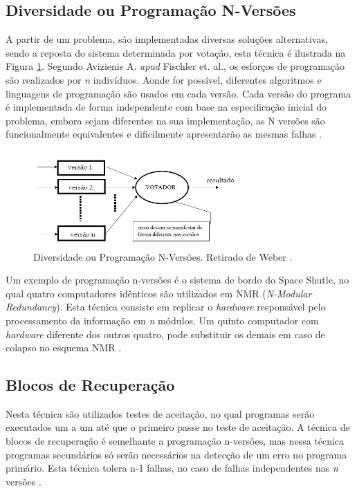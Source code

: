 \subsection{Diversidade ou Programação N-Versões}

A partir de um problema, são implementadas diversas soluções alternativas, sendo a reposta do sistema determinada por votação, esta técnica é ilustrada na Figura \ref{Img:nVersion}. Segundo Avizienis \cite{Avizienis:1995} A. \textit{apud} Fischler et. al., os esforços de programação são realizados por \textit{n} indivíduos. Aonde for possível, diferentes algoritmos e linguagens de programação são usados em cada versão. Cada versão do programa é implementada de forma independente com base na especificação inicial do problema, embora sejam diferentes na sua implementação, as N versões são funcionalmente equivalentes e dificilmente apresentarão as mesmas falhas \cite{Avizienis:1995}. 

\begin{figure}[H]
	\centering
	\includegraphics[width=0.7\textwidth]{figuras/nVersions.jpg}
	\caption[Programação N-Versões]{Diversidade ou Programação N-Versões. Retirado de Weber \cite{Weber:2002}.}
	\label{Img:nVersion}	
\end{figure}  

Um exemplo de programação n-versões é o sistema de bordo do Space Shutle, no qual quatro computadores idênticos são utilizados em NMR (\textit{N-Modular Redundancy}). Esta técnica consiste em replicar o \textit{hardware} responsável pelo processamento da informação em \textit{n} módulos. Um quinto computador com \textit{hardware} diferente dos outros quatro, pode substituir os demais em caso de colapso no esquema NMR \cite{Pradhan:1996}.

\subsection{Blocos de Recuperação}

Nesta técnica são utilizados testes de aceitação, no qual programas serão executados um a um até que o primeiro passe no teste de aceitação. A técnica de blocos de recuperação é semelhante a programação n-versões, mas nessa técnica programas secundários só serão necessários na detecção de um erro no programa primário. Esta técnica tolera n-1 falhas, no caso de falhas independentes nas \textit{n} versões \cite{Nelson:1990, Weber:2002, Somani:1997}.   

